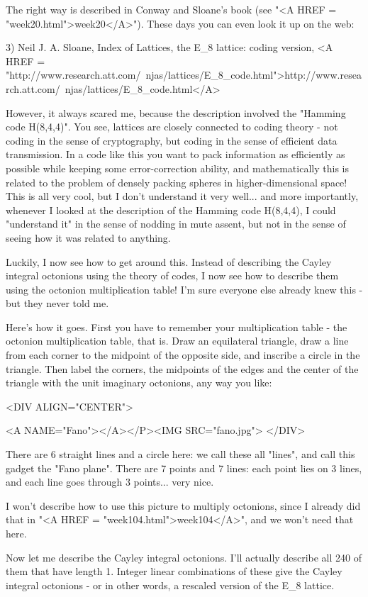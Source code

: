 The right way is described in Conway and Sloane's book (see "<A
HREF = "week20.html">week20</A>").  These days you can even look it
up on the web:

3) Neil J. A. Sloane, Index of Lattices, the E_{8} lattice: coding version,
<A HREF = "http://www.research.att.com/~njas/lattices/E_{8}_code.html">http://www.research.att.com/~njas/lattices/E_{8}_code.html</A>

However, it always scared me, because the description involved the
"Hamming code H(8,4,4)".  You see, lattices are closely connected to
coding theory - not coding in the sense of cryptography, but coding in
the sense of efficient data transmission.  In a code like this you want
to pack information as efficiently as possible while keeping some
error-correction ability, and mathematically this is related to the
problem of densely packing spheres in higher-dimensional space!  This is
all very cool, but I don't understand it very well...  and more
importantly, whenever I looked at the description of the Hamming code
H(8,4,4), I could "understand it" in the sense of nodding in mute
assent, but not in the sense of seeing how it was related to anything.

Luckily, I now see how to get around this.  Instead of describing
the Cayley integral octonions using the theory of codes, I now see
how to describe them using the octonion multiplication table!  
I'm sure everyone else already knew this - but they never told me.

Here's how it goes.  First you have to remember your multiplication
table - the octonion multiplication table, that is.  Draw an equilateral
triangle, draw a line from each corner to the midpoint of the opposite
side, and inscribe a circle in the triangle.  Then label the corners,
the midpoints of the edges and the center of the triangle with the unit
imaginary octonions, any way you like:

<DIV ALIGN="CENTER">

<A NAME="Fano"></A></P><IMG SRC="fano.jpg">
</DIV>

There are 6 straight lines and a circle here: we call these all
"lines", and call this gadget the "Fano plane".
There are 7 points and 7 lines: each point lies on 3 lines, and each
line goes through 3 points... very nice.

I won't describe how to use this picture to multiply octonions, since I
already did that in "<A HREF = "week104.html">week104</A>",
and we won't need that here.

Now let me describe the Cayley integral octonions.  I'll actually
describe all 240 of them that have length 1.  Integer linear
combinations of these give the Cayley integral octonions - or in 
other words, a rescaled version of the E_{8} lattice.

